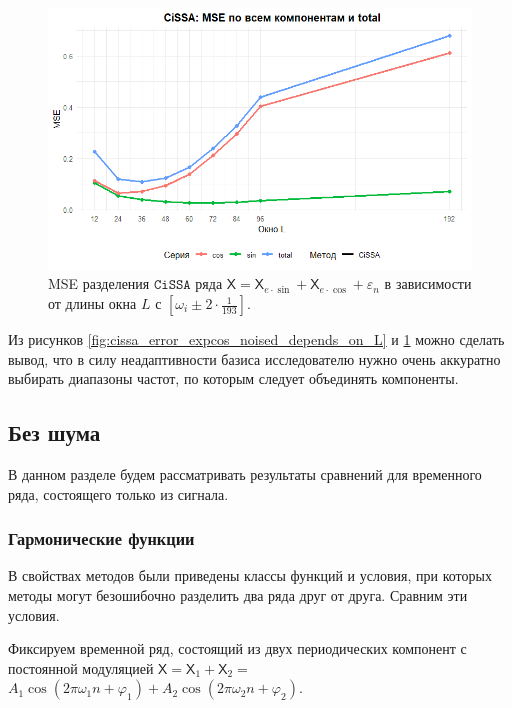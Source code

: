 \documentclass[12pt, specialist, subf
]{disser}
\theoremstyle{definition}
\newcommand{\CISSA}{\texttt{CiSSA}}
\newcommand{\TS}{\mathsf{X}}
\begin{document}
 \begin{figure}[H]
	\centering
	\includegraphics[width=1\textwidth]{img/cissa_errors_plot_expcos_noised_2.png}
	\caption{MSE разделения $\CISSA$ ряда $\TS = \TS_{e\cdot\sin} + \TS_{e\cdot\cos} + \varepsilon_n$ в зависимости от длины окна $L$ с $[\omega_i \pm 2 \cdot \frac{1}{193}]$.}
	\label{fig:cissa_error_expcos_noised_depends_on_L_2}
\end{figure}


Из рисунков \ref{fig:cissa_error_expcos_noised_depends_on_L} и \ref{fig:cissa_error_expcos_noised_depends_on_L_2} можно сделать вывод, что в силу неадаптивности базиса исследователю нужно очень аккуратно выбирать диапазоны частот, по которым следует объединять компоненты.


\subsection{Без шума}
\label{subsec:cissa_examples_without_noise}

В данном разделе будем рассматривать результаты сравнений для временного ряда, состоящего только из сигнала.



\subsubsection{Гармонические функции}
\label{subsubsec:exact}

В свойствах методов были приведены классы функций и условия, при которых методы могут безошибочно разделить два ряда друг от друга. Сравним эти условия.


Фиксируем временной ряд, состоящий из двух периодических компонент с постоянной модуляцией  $\TS = \TS_{1} + \TS_{2} =$ $A_1 \cos(2\pi \omega_1 n + \varphi_1) + A_2 \cos(2\pi \omega_2 n + \varphi_2)$.
\end{document}
